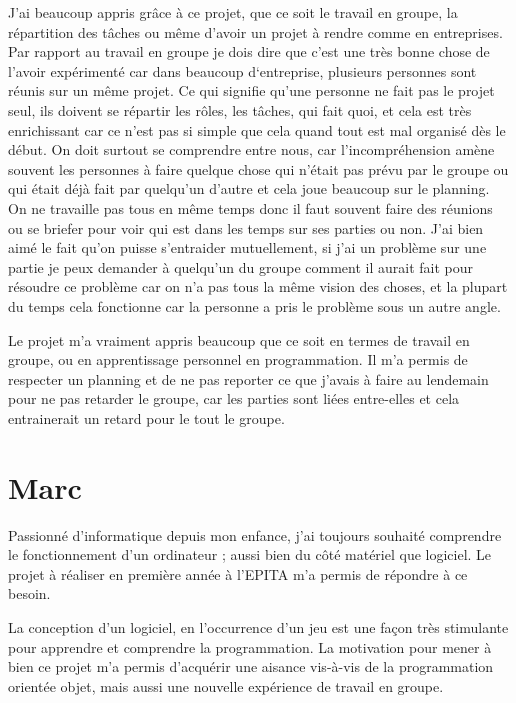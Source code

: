 \documentclass[11pt]{report}
\begin{document}
J’ai beaucoup appris grâce à ce projet, que ce soit le travail en groupe, la répartition des tâches ou même d’avoir un projet à rendre comme en entreprises. Par rapport au travail en groupe je dois dire que c’est une très bonne chose de l’avoir expérimenté car dans beaucoup d‘entreprise, plusieurs personnes sont réunis sur un même projet. Ce qui signifie qu’une personne ne fait pas le projet seul, ils doivent se répartir les rôles, les tâches, qui fait quoi, et cela est très enrichissant car ce n’est pas si simple que cela quand tout est mal organisé dès le début. On doit surtout se comprendre entre nous, car l’incompréhension amène souvent les personnes à faire quelque chose qui n’était pas prévu par le groupe ou qui était déjà fait par quelqu’un d’autre et cela joue beaucoup sur le planning. On ne travaille pas tous en même temps donc il faut souvent faire des réunions ou se briefer pour voir qui est dans les temps sur ses parties ou non. J’ai bien aimé le fait qu’on puisse s’entraider mutuellement, si j’ai un problème sur une partie je peux demander à quelqu’un du groupe comment il aurait fait pour résoudre ce problème car on n’a pas tous la même vision des choses, et la plupart du temps cela fonctionne car la personne a pris le problème sous un autre angle.

Le projet m’a vraiment appris beaucoup que ce soit en termes de travail en groupe, ou en apprentissage personnel en programmation. Il m’a permis de respecter un planning et de ne pas reporter ce que j’avais à faire au lendemain pour ne pas retarder le groupe, car les parties sont liées entre-elles et cela entrainerait un retard pour le tout le groupe. 


\section{Marc}

Passionné d’informatique depuis mon enfance, j’ai toujours souhaité comprendre le fonctionnement d’un ordinateur ; aussi bien du côté matériel que logiciel. Le projet à réaliser en première année à l’EPITA m’a permis de répondre à ce besoin.

La conception d’un logiciel, en l’occurrence d’un jeu est une façon très stimulante pour apprendre et comprendre la programmation. La motivation pour mener à bien ce projet m’a permis d’acquérir une aisance vis-à-vis de la programmation orientée objet, mais aussi une nouvelle expérience de travail en groupe.
\end{document}
